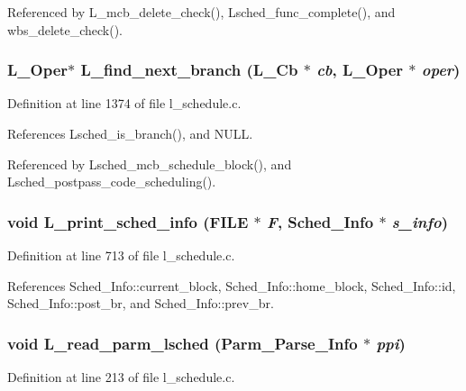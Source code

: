 Referenced by L\_\-mcb\_\-delete\_\-check(), Lsched\_\-func\_\-complete(), and wbs\_\-delete\_\-check().
\subsubsection{\setlength{\rightskip}{0pt plus 5cm}L\_\-Oper$\ast$ L\_\-find\_\-next\_\-branch (L\_\-Cb $\ast$ {\em cb}, L\_\-Oper $\ast$ {\em oper})}\label{l__schedule_8c_6d691d5261d79228e4e680680a58f405}




Definition at line 1374 of file l\_\-schedule.c.

References Lsched\_\-is\_\-branch(), and NULL.

Referenced by Lsched\_\-mcb\_\-schedule\_\-block(), and Lsched\_\-postpass\_\-code\_\-scheduling().
\subsubsection{\setlength{\rightskip}{0pt plus 5cm}void L\_\-print\_\-sched\_\-info (FILE $\ast$ {\em F}, \bf{Sched\_\-Info} $\ast$ {\em s\_\-info})}\label{l__schedule_8c_984f853032a84d37536ca6225c560c9a}




Definition at line 713 of file l\_\-schedule.c.

References Sched\_\-Info::current\_\-block, Sched\_\-Info::home\_\-block, Sched\_\-Info::id, Sched\_\-Info::post\_\-br, and Sched\_\-Info::prev\_\-br.
\subsubsection{\setlength{\rightskip}{0pt plus 5cm}void L\_\-read\_\-parm\_\-lsched (\bf{Parm\_\-Parse\_\-Info} $\ast$ {\em ppi})}\label{l__schedule_8c_a94ad87ba5f6079a85916abd4c36e0c2}




Definition at line 213 of file l\_\-schedule.c.

